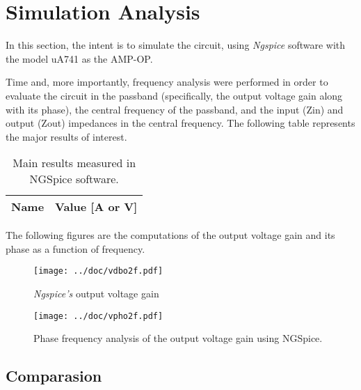 \section{Simulation Analysis}
\label{sec:simulation}

In this section, the intent is to simulate the circuit, using \textit{Ngspice} software with the model uA741 as the AMP-OP.

Time and, more importantly, frequency analysis were performed in order to evaluate the circuit in the passband (specifically, the output voltage gain along with its phase), the central frequency of the passband, and the input (Zin) and output (Zout) impedances in the central frequency. The following table represents the major results of interest.

\begin{table}[h]
    \centering
    \begin{tabular}{|l|r|}
      \hline    
      {\bf Name} & {\bf Value [A or V]} \\ \hline
      
      
      
    \end{tabular}
    \caption{Main results measured in NGSpice software.}
 \end{table}


The following figures are the computations of the output voltage gain and its phase as a function of frequency.

\begin{figure}[!htb]
    \centering
    \texttt{[image: ../doc/vdbo2f.pdf]}
    \caption{\textit{Ngspice's} output voltage gain}
\end{figure}

\begin{figure}[!htb]
    \centering
    \texttt{[image: ../doc/vpho2f.pdf]}
    \caption{Phase frequency analysis of the output voltage gain using NGSpice.}
\end{figure}



\clearpage

\subsection{Comparasion}
\label{sec:comparasion}